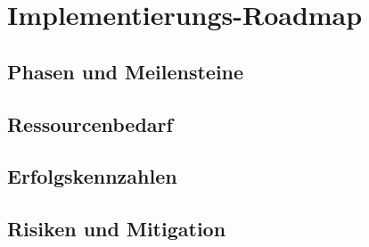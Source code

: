 \chapter{Implementierungs-Roadmap}\label{chap:roadmap}

\section{Phasen und Meilensteine}\label{sec:phasen}

\section{Ressourcenbedarf}\label{sec:ressourcen}

\section{Erfolgskennzahlen}\label{sec:kennzahlen}

\section{Risiken und Mitigation}\label{sec:risiken}
